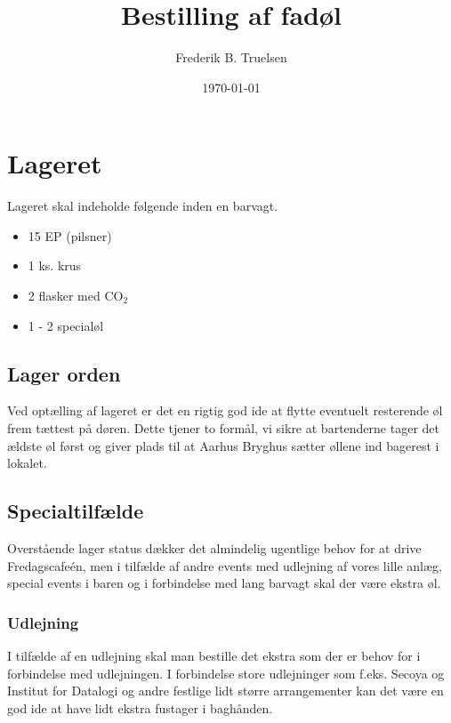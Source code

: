 

\title{Bestilling af fadøl}
\date{\today}
\author{Frederik B. Truelsen}



\maketitle

\section{Lageret}

Lageret skal indeholde følgende inden en barvagt.

\begin{itemize}
\item 15 EP (pilsner)
\item 1 ks. krus
\item 2 flasker med CO$_{2}$
\item 1 - 2 specialøl
\end{itemize} 

\subsection{Lager orden}

Ved optælling af lageret er det en rigtig god ide at flytte eventuelt resterende øl frem tættest på døren.
Dette tjener to formål, vi sikre at bartenderne tager det ældste øl først og giver plads til at Aarhus Bryghus
sætter øllene ind bagerest i lokalet.

\subsection{Specialtilfælde}

Overstående lager status dækker det almindelig ugentlige behov for at drive Fredagscafeén,
men i tilfælde af andre events med udlejning af vores lille anlæg, special events i baren og
i forbindelse med lang barvagt skal der være ekstra øl.

\subsubsection*{Udlejning}

I tilfælde af en udlejning skal man bestille det ekstra som der er behov for i forbindelse med
udlejningen. I forbindelse store udlejninger som f.eks. Secoya og Institut for Datalogi og andre
festlige lidt større arrangementer  kan det være en god ide at have lidt ekstra fustager i baghånden.

